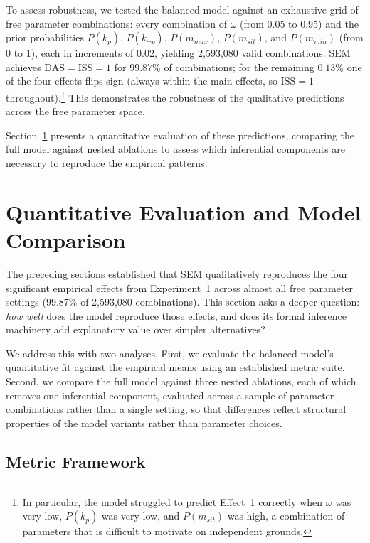 \documentclass[12pt,a4paper]{article}
\begin{document}
To assess robustness, we tested the balanced model against an exhaustive grid of
free parameter combinations: every combination of $\omega$ (from 0.05 to 0.95)
and the prior probabilities $P(k_p)$, $P(k_{\neg p})$, $P(m_{max})$,
$P(m_{sit})$, and $P(m_{min})$ (from 0 to 1), each in increments of 0.02,
yielding 2,593,080 valid combinations. 
SEM achieves $\mathrm{DAS} = \mathrm{ISS} = 1$ for $99.87\%$ of combinations; for
the remaining $0.13\%$ one of the four effects flips sign (always within the main
effects, so $\mathrm{ISS} = 1$ throughout).\footnote{In particular, the model struggled to predict
Effect~1 correctly when $\omega$ was very low, $P(k_p)$ was very low, and
$P(m_{sit})$ was high, a combination of parameters that is difficult to
motivate on independent grounds.} This demonstrates the robustness of the
qualitative predictions across the free parameter space.

Section~\ref{sec:evaluation} presents a quantitative evaluation of these
predictions, comparing the full model against nested ablations to assess which
inferential components are necessary to reproduce the empirical patterns.




\section{Quantitative Evaluation and Model Comparison}
\label{sec:evaluation}

The preceding sections established that SEM qualitatively reproduces the four
significant empirical effects from Experiment~1 across almost all free parameter
settings (99.87\% of 2,593,080 combinations). This section asks a deeper
question: \emph{how well} does the model reproduce those effects, and does its
formal inference machinery add explanatory value over simpler alternatives?

We address this with two analyses. First, we evaluate the balanced model's
quantitative fit against the empirical means using an established metric suite.
Second, we compare the full model against three nested ablations, each of which
removes one inferential component, evaluated across a sample of parameter
combinations rather than a single setting, so that differences reflect structural
properties of the model variants rather than parameter choices.


\subsection{Metric Framework}
\label{sec:metrics}
\end{document}
